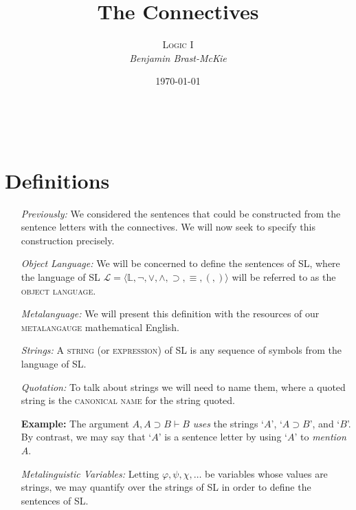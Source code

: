 \documentclass[a4paper, 11pt]{article} %
\title{\textbf{The Connectives}} %
\author{\textsc{Logic I}\\ \em Benjamin Brast-McKie} %
\date{\today} %
\makeatletter
\newcommand{\tuple}[1]{\langle#1\rangle} %
\renewcommand{\maketitle}{ %
\begin{flushright} %
{\LARGE\@title} %

\vspace{10pt} %

{\@author} %
\\\@date %

\vspace{10pt} %
\end{flushright}
}
\makeatother
\begin{document}
\maketitle %

\thispagestyle{empty}




\section*{Definitions}

\begin{enumerate}[leftmargin=1.5in,labelsep=.15in] %
  \item[\it Previously:] We considered the sentences that could be constructed from the sentence letters with the connectives. We will now seek to specify this construction precisely.
  \item[\it Object Language:] We will be concerned to define the sentences of SL, where the language of SL $\mathcal{L}=\tuple{\mathbb{L},\neg,\vee,\wedge,\supset,\equiv,(,)}$ will be referred to as the \textsc{object language}.
  \item[\it Metalanguage:] We will present this definition with the resources of our \textsc{metalangauge} mathematical English.
  \item[\it Strings:] A \textsc{string} (or \textsc{expression}) of SL is any sequence of symbols from the language of SL.
  \item[\it Quotation:] To talk about strings we will need to name them, where a quoted string is the \textsc{canonical name} for the string quoted.
  \item[\bf Example:] The argument $A, A\supset B \vdash B$ \textit{uses} the strings `$A$', `$A \supset B$', and `$B$'. By contrast, we may say that `$A$' is a sentence letter by using `$A$' to \textit{mention} $A$.
  \item[\it Metalinguistic Variables:] Letting $\varphi,\psi,\chi,\ldots$ be variables whose values are strings, we may quantify over the strings of SL in order to define the sentences of SL.
\end{enumerate}
\end{document}
